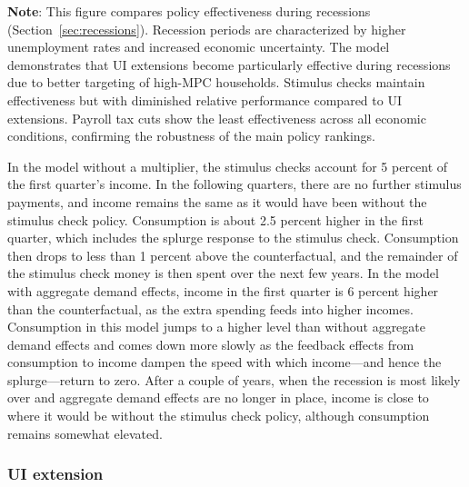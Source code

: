 \documentclass[qe]{econsocart}
\begin{document}
\noindent\parbox{\textwidth}{\footnotesize
  \textbf{Note}: This figure compares policy effectiveness during recessions (Section~\ref{sec:recessions}).
  Recession periods are characterized by higher unemployment rates and increased economic uncertainty.
  The model demonstrates that UI extensions become particularly effective during recessions due to
  better targeting of high-MPC households. Stimulus checks maintain effectiveness but with diminished
  relative performance compared to UI extensions. Payroll tax cuts show the least effectiveness
  across all economic conditions, confirming the robustness of the main policy rankings.
}

\vspace{1em}
\FloatBarrier %

In the model without a multiplier, the stimulus checks account for 5 percent of the first quarter's income.
In the following quarters, there are no further stimulus payments, and income remains the same as it would have been without the stimulus check policy.
Consumption is about 2.5 percent higher in the first quarter, which includes the splurge response to the stimulus check.
Consumption then drops to less than 1 percent above the counterfactual, and the remainder of the stimulus check money is then spent over the next few years.
In the model with aggregate demand effects, income in the first quarter is 6 percent higher than the counterfactual, as the extra spending feeds into higher incomes.
Consumption in this model jumps to a higher level than without aggregate demand effects and comes down more slowly as the feedback effects from consumption to income dampen the speed with which income---and hence the splurge---return to zero.
After a couple of years, when the recession is most likely over and aggregate demand effects are no longer in place, income is close to where it would be without the stimulus check policy, although consumption remains somewhat elevated.

\subsubsection{UI extension}
\end{document}
